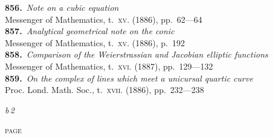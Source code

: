 \documentclass[11pt,a4paper]{article}
\providecommand{\textsc}[1]{{\scshape #1}}
\begin{document}
\textbf{856.}~\textit{Note on a cubic equation}~\\
\hspace*{2em}Messenger of Mathematics, t.~\textsc{xv}. (1886), pp.~62---64\\[0.3em]
\textbf{857.}~\textit{Analytical geometrical note on the conic}~\\
\hspace*{2em}Messenger of Mathematics, t.~\textsc{xv}. (1886), p.~192\\[0.3em]
\textbf{858.}~\textit{Comparison of the Weierstrassian and Jacobian elliptic functions}~\\
\hspace*{2em}Messenger of Mathematics, t.~\textsc{xvi}. (1887), pp.~129---132\\[0.3em]
\textbf{859.}~\textit{On the complex of lines which meet a unicursal quartic curve}~\\
\hspace*{2em}Proc. Lond. Math. Soc., t.~\textsc{xvii}. (1886), pp.~232---238

\vspace{1em}\hfill\textit{b\,2}

\clearpage

\thispagestyle{plain}
\vspace*{1em}
\hfill\textsc{page}
\end{document}
